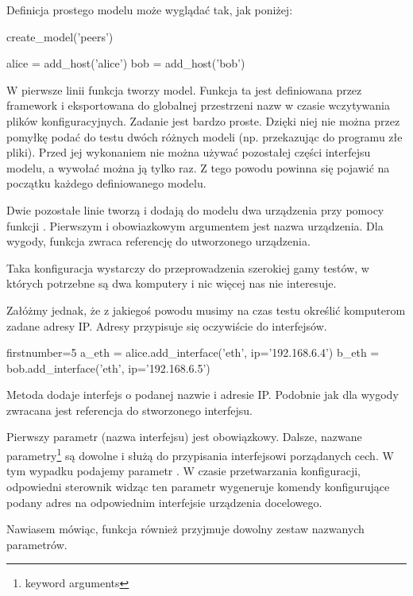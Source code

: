 \documentclass[00-praca-magisterska.tex]{subfiles}
\begin{document}
Definicja prostego modelu może wyglądać tak, jak poniżej:

\begin{pythoncode}
  create_model('peers')

  alice = add_host('alice')
  bob   = add_host('bob')
\end{pythoncode}

W pierwsze linii funkcja  tworzy model. Funkcja ta jest
definiowana przez framework i eksportowana do globalnej przestrzeni nazw w
czasie wczytywania plików konfiguracyjnych. Zadanie  jest
bardzo proste. Dzięki niej nie można przez pomyłkę podać do testu dwóch
różnych modeli (np. przekazując do programu złe pliki). Przed jej wykonaniem
nie można używać pozostałej części interfejsu modelu, a wywołać można ją tylko
raz. Z tego powodu powinna się pojawić na początku każdego definiowanego
modelu.

Dwie pozostałe linie tworzą i dodają do modelu dwa urządzenia przy pomocy
funkcji . Pierwszym i obowiazkowym argumentem jest nazwa
urządzenia. Dla wygody, funkcja zwraca referencję do utworzonego urządzenia.

Taka konfiguracja wystarczy do przeprowadzenia szerokiej gamy testów, w
których potrzebne są dwa komputery i nic więcej nas nie interesuje.

Załóżmy jednak, że z jakiegoś powodu musimy na czas testu określić komputerom
zadane adresy IP. Adresy przypisuje się oczywiście do interfejsów.

\begin{pythoncode*}{firstnumber=5}
  a_eth = alice.add_interface('eth', ip='192.168.6.4')
  b_eth = bob.add_interface('eth', ip='192.168.6.5')
\end{pythoncode*}

Metoda  dodaje interfejs o podanej nazwie i adresie IP.
Podobnie jak  dla wygody zwracana jest referencja do
stworzonego interfejsu.

Pierwszy parametr (nazwa interfejsu) jest obowiązkowy. Dalsze, nazwane
parametry\footnote{keyword arguments} są dowolne i służą do przypisania
interfejsowi porządanych cech.  W tym wypadku podajemy parametr . W
czasie przetwarzania konfiguracji, odpowiedni sterownik widząc ten parametr
wygeneruje komendy konfigurujące podany adres na odpowiednim interfejsie
urządzenia docelowego.

Nawiasem mówiąc, funkcja  również przyjmuje dowolny zestaw
nazwanych parametrów.
\end{document}
